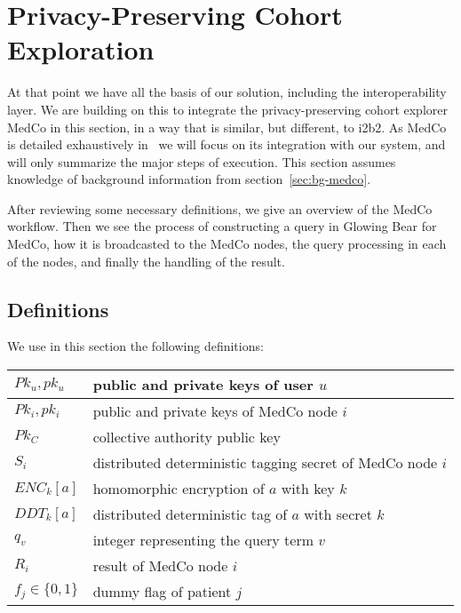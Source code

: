\chapter{Privacy-Preserving Cohort Exploration}
\label{sec:medco}

At that point we have all the basis of our solution, including the interoperability layer.
We are building on this to integrate the privacy-preserving cohort explorer MedCo in this section, in a way that is similar, but different, to i2b2.
As MedCo is detailed exhaustively in~\cite{todo} we will focus on its integration with our system, and will only summarize the major steps of execution.
This section assumes knowledge of background information from section~\ref{sec:bg-medco}.

After reviewing some necessary definitions, we give an overview of the MedCo workflow.
Then we see the process of constructing a query in Glowing Bear for MedCo, how it is broadcasted to the MedCo nodes, the query processing in each of the nodes, and finally the handling of the result.


\section*{Definitions}

We use in this section the following definitions:

\begin{center}
\begin{tabular}{|l|l|}
\hline
$Pk_u, pk_u$ & public and private keys of user $u$ \\\hline
$Pk_i, pk_i$ & public and private keys of MedCo node $i$ \\\hline
$Pk_C$ & collective authority public key \\\hline
$S_i$ & distributed deterministic tagging secret of MedCo node $i$ \\\hline
$ENC_k[a]$ & homomorphic encryption of $a$ with key $k$ \\\hline
$DDT_k[a]$ & distributed deterministic tag of $a$ with secret $k$ \\\hline
$q_v$ & integer representing the query term $v$ \\\hline
$R_i$ & result of MedCo node $i$ \\\hline
$f_j \in \{0, 1\}$ & dummy flag of patient $j$ \\\hline
\end{tabular}
\end{center}


